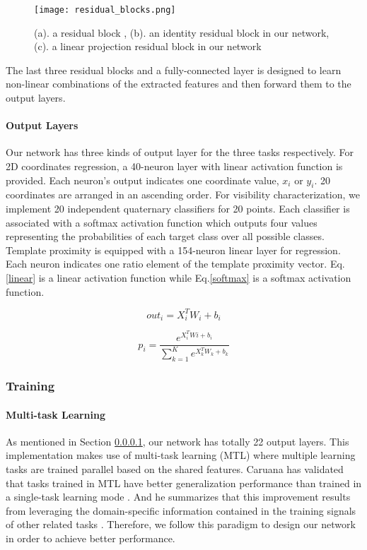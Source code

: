 \begin{figure}[h]		
	\texttt{[image: residual\_blocks.png]}
	\caption{(a). a residual block \cite{DBLP:journals/corr/HeZRS15}, (b). an identity residual block in our network, (c). a linear projection residual block in our network}
	\centering
	\label{figure:residual_blocks}
\end{figure}

The last three residual blocks and a fully-connected layer is designed to learn non-linear combinations of the extracted features and then forward them to the output layers.

\paragraph{Output Layers}
\label{output}

Our network has three kinds of output layer for the three tasks respectively. For 2D coordinates regression, a 40-neuron layer with linear activation function is provided.  Each neuron's output indicates one coordinate value, \ie $x_i$ or $y_i$.  20 coordinates are arranged in an ascending order. For visibility characterization, we implement 20 independent quaternary classifiers for 20 points. Each classifier is associated with a softmax activation function \cite{Bishop:2006:PRM:1162264} which outputs four values representing the probabilities of each target class over all possible classes. Template proximity is equipped with a 154-neuron linear layer for regression.  Each neuron indicates one ratio element of the template proximity vector. Eq.\ref{linear} is a linear activation function while Eq.\ref{softmax} is a softmax activation function.

\begin{equation}
\label{linear}
out_i = X_i^T W_i+b_i
\end{equation}

\begin{equation}
\label{softmax}
p_i = \frac{e^{X_i^TWi+b_i}}{\sum_{k=1}^K e^{X_k^TW_k+b_k}}
\end{equation}


\subsubsection{Training}

\paragraph{Multi-task Learning}
As mentioned in Section \ref{output}, our network has totally 22 output layers. This implementation makes use of multi-task learning (MTL) where multiple learning tasks are trained parallel based on the shared features. Caruana has validated that tasks trained in MTL have better generalization performance than trained in a single-task learning mode \cite{Caruana1997}. And he summarizes that this improvement results from leveraging the domain-specific information contained in the training signals of other related tasks \cite{Caruana1997}. Therefore, we follow this paradigm to design our network in order to achieve better performance.

